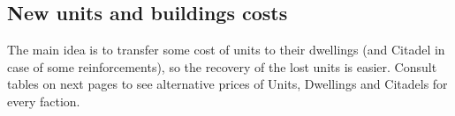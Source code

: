 \begin{multicols*}{2}
    \subsection*{New units and buildings costs}
    
    The main idea is to transfer some cost of units to their dwellings (and Citadel in case of some reinforcements), so the recovery of the lost units is easier. Consult tables on next pages to see alternative prices of Units, Dwellings and Citadels for every faction.
\end{multicols*}
